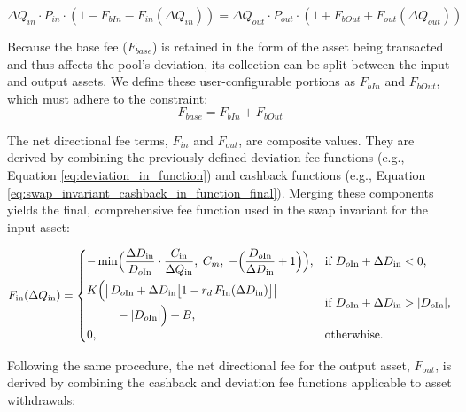 \begin{equation}
	\label{eq:swap_invariant}
	\Delta Q_{in} \cdot P_{in} \cdot (1 - F_{bIn} - F_{in}(\Delta Q_{in})) = \Delta Q_{out} \cdot P_{out} \cdot (1 + F_{bOut} + F_{out}(\Delta Q_{out}))
\end{equation}

Because the base fee ($F_{base}$) is retained in the form of the asset being transacted and thus affects the pool's deviation, its collection can be split between the input and output assets. We define these user-configurable portions as $F_{bIn}$ and $F_{bOut}$, which must adhere to the constraint:
\begin{equation}
	F_{base} = F_{bIn} + F_{bOut}
\end{equation}

The net directional fee terms, $F_{in}$ and $F_{out}$, are composite values. They are derived by combining the previously defined deviation fee functions (e.g., Equation \ref{eq:deviation_in_function}) and cashback functions (e.g., Equation \ref{eq:swap_invariant_cashback_in_function_final}). Merging these components yields the final, comprehensive fee function used in the swap invariant for the input asset:

\begin{equation}
	\label{eq:fee_in_formula}
	F_{\mathrm{in}}(\Delta Q_{\mathrm{in}})
	=
	\begin{cases}
		-\displaystyle
		\min\Bigl(
		\frac{\Delta D_{\mathrm{in}}}{D_{o\mathrm{In}}}
		\cdot \frac{C_{\mathrm{in}}}{\Delta Q_{\mathrm{in}}},
		\;C_{m},
		\;-\Bigl(\frac{D_{o\mathrm{In}}}{\Delta D_{\mathrm{in}}} + 1\Bigr)
		\Bigr),
		& \text{if } D_{o\mathrm{In}} + \Delta D_{\mathrm{in}} < 0,
		\\[2ex]

		\displaystyle
		\begin{aligned}
			K\Bigl(&\bigl\lvert\,D_{o\mathrm{In}}
			+ \Delta D_{\mathrm{in}}
			\bigl[1 - r_{d}\,F_{ \mathrm{In} }(\Delta D_{\mathrm{in}})\bigr]
			\bigr\rvert \\
			&\quad - \lvert D_{o\mathrm{In}}\rvert\Bigr)
			+ B,
		\end{aligned}
		& \text{if } D_{o\mathrm{In}} + \Delta D_{\mathrm{in}}
		> \lvert D_{o\mathrm{In}}\rvert,
		\\[2ex]
		0,
		& \text{otherwhise.}
	\end{cases}
\end{equation}


Following the same procedure, the net directional fee for the output asset, $F_{out}$, is derived by combining the cashback and deviation fee functions applicable to asset withdrawals:


